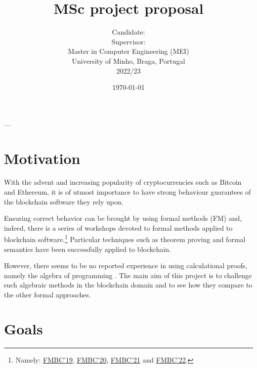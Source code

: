 \documentclass[a4paper, 11pt]{article} %
\title{\textbf{MSc project proposal}\\ \vspace{0.5cm}\msctitle}
\author{
	  Candidate:  \textsc{\msccandidate}
	\\Supervisor: \textsc{\mscsupervisor}
	\\
	\vspace{0.5cm}
    \normalsize{Master in Computer Engineering (MEI)\\ University of Minho, Braga, Portugal}
    \\ 2022/23
    } %
\date{\today}
\makeatletter
\renewcommand{\maketitle}{ %
\begin{center} %
{\LARGE\@title} %

\vspace{50pt} %

{\large\@author} %

\vspace{40pt} %
\end{center}
}
\makeatother
\begin{document}
\maketitle %





--- %

\section*{Motivation}

With the advent and increasing popularity of cryptocurrencies such as Bitcoin and Ethereum, it is of utmost importance to have strong behaviour guarantees of the blockchain software they rely upon.

Ensuring correct behavior can be brought by using formal methods (FM) and,
indeed, there is a series of workshops devoted to formal methods applied
to blockchain software.\footnote{Namely: \href{https://sites.google.com/view/fmbc}{FMBC'19}, \href{https://fmbc.gitlab.io/2020}{FMBC'20}, \href{https://fmbc.gitlab.io/2021}{FMBC'21} and \href{https://fmbc.gitlab.io/2022}{FMBC'22}.} Particular techniques such as theorem proving and
formal semantics have been successfully applied to blockchain.

However, there seems
to be no reported experience in using calculational proofs, namely the algebra
of programming \cite{BM97,Ol05}. The main aim of this project is to challenge such algebraic methods
in the blockchain domain and to see how they compare to the other formal approaches.

\section*{Goals}
\end{document}
